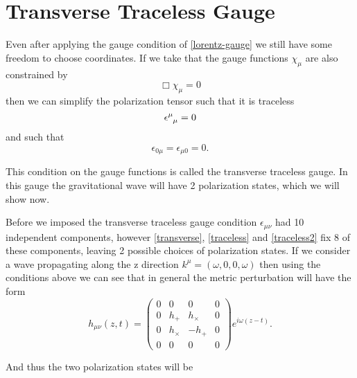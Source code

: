 \section{Transverse Traceless Gauge}

Even after applying the gauge condition of \eqref{lorentz-gauge} we still have some freedom to choose coordinates. If we take that the gauge functions \(\chi_{\mu}\) are also constrained by \cite{cheng}
\begin{equation} \label{guage2}
	\Box \chi_{\mu} = 0
\end{equation}
then we can simplify the polarization tensor such that it is traceless \cite{cheng}
\begin{equation} \label{traceless}
	\epsilon\indices{^\mu_\mu} = 0
\end{equation}
and such that
\begin{equation} \label{traceless2}
	\epsilon_{0 \mu} = \epsilon_{\mu 0} = 0 .
\end{equation}

This condition on the gauge functions is called the transverse traceless gauge. In this gauge the gravitational wave will have 2 polarization states, which we will show now.

Before we imposed the transverse traceless gauge condition \(\epsilon_{\mu \nu}\) had 10 independent components, however \eqref{transverse}, \eqref{traceless} and \eqref{traceless2} fix 8 of these components, leaving 2 possible choices of polarization states. If we consider a wave propagating along the z direction \(k^{\mu} = (\omega, 0,0,\omega)\) then using the conditions above we can see that in general the metric perturbation will have the form \cite{cheng, hartle}
\begin{equation} \label{wave-tt-gauge}
	h_{\mu \nu}(z,t) = 
	\begin{pmatrix}
	0 & 0 & 0 & 0 \\
	0 & h_{+} & h_{\times} & 0 \\
	0 & h_{\times} & - h_{+} & 0 \\
	0 & 0 & 0 & 0
	\end{pmatrix}
	e^{i \omega (z - t)} .
\end{equation}

And thus the two polarization states will be


